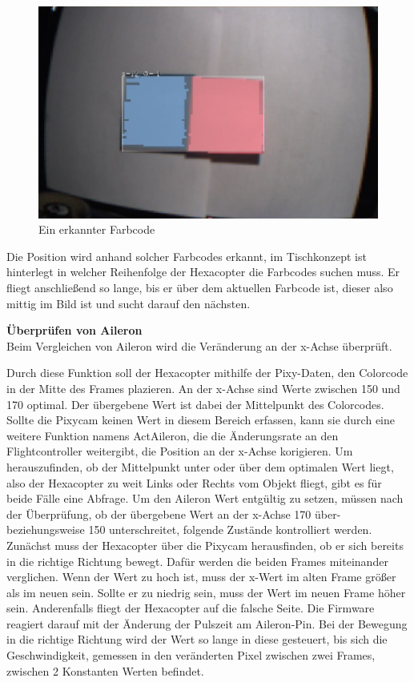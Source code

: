     \begin{figure} [tbh]
      \begin{centering}
        \includegraphics[width = \textwidth]{Bilder/Farbcode_erkannt}
      \par\end{centering}
      \caption{Ein erkannter Farbcode}
      \label{Farbcode_erkannt}
    \end{figure}
    Die Position wird anhand solcher Farbcodes erkannt, im Tischkonzept ist hinterlegt in welcher Reihenfolge der Hexacopter die Farbcodes suchen muss.
    Er fliegt anschließend so lange, bis er über dem aktuellen Farbcode ist, dieser also mittig im Bild ist und sucht darauf den nächsten.


    \textbf{Überprüfen von Aileron}\\
    Beim Vergleichen von Aileron wird die Veränderung an der x-Achse überprüft. 

    Durch diese Funktion soll der Hexacopter mithilfe der Pixy-Daten, den Colorcode in der Mitte des Frames plazieren. An der x-Achse sind Werte zwischen 150 und 170 optimal. Der übergebene Wert ist dabei der Mittelpunkt des Colorcodes. 
    Sollte die Pixycam keinen Wert in diesem Bereich erfassen, kann sie durch eine weitere Funktion namens ActAileron, die die Änderungsrate an den Flightcontroller weitergibt, die Position an der x-Achse korigieren.
    Um herauszufinden, ob der Mittelpunkt unter oder über dem optimalen Wert liegt, also der Hexacopter zu weit Links oder Rechts vom Objekt fliegt, gibt es für beide Fälle eine Abfrage.
    Um den Aileron Wert entgültig zu setzen, müssen nach der Überprüfung, ob der übergebene Wert an der x-Achse 170 über- beziehungsweise 150 unterschreitet, folgende Zustände kontrolliert werden.
    Zunächst muss der Hexacopter über die Pixycam herausfinden, ob er sich bereits in die richtige Richtung bewegt. Dafür werden die beiden Frames miteinander verglichen. Wenn der Wert zu hoch ist, muss der x-Wert im alten Frame größer als im neuen sein. Sollte er zu niedrig sein, muss der Wert im neuen Frame höher sein.
    Anderenfalls fliegt der Hexacopter auf die falsche Seite. Die Firmware reagiert darauf mit der Änderung der Pulszeit am Aileron-Pin.
    Bei der Bewegung in die richtige Richtung wird der Wert so lange in diese gesteuert, bis sich die Geschwindigkeit, gemessen in den veränderten Pixel zwischen zwei Frames, zwischen 2 Konstanten Werten befindet.


